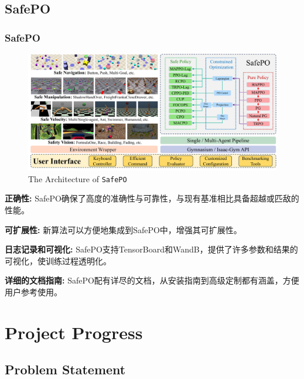 \documentclass[10pt,mathserif]{beamer}%
\begin{document}
\subsection{SafePO}
\begin{frame}[t,fragile]

    \frametitle{SafePO}
\begin{figure}[ht]
  \centering
  \includegraphics[width=0.8\linewidth]{Safety-Gymnasium/assets/main-paper/arch.pdf}
  \vspace*{-0.5\baselineskip}
  \caption{The Architecture of \texttt{SafePO}}
  \label{pic:architecture}
\end{figure}
\vspace{-0.5cm}
\begin{itemize}
{
\fontsize{8pt}{9.6pt}\selectfont
    \item \textbf{正确性:} SafePO确保了高度的准确性与可靠性，与现有基准相比具备超越或匹敌的性能。
    \item \textbf{可扩展性:} 新算法可以方便地集成到SafePO中，增强其可扩展性。
    \item \textbf{日志记录和可视化:} SafePO支持TensorBoard和WandB，提供了许多参数和结果的可视化，使训练过程透明化。
    \item \textbf{详细的文档指南:} SafePO配有详尽的文档，从安装指南到高级定制都有涵盖，方便用户参考使用。
}
\end{itemize}

\end{frame}

\section{Project Progress}

\subsection{Problem Statement}
\end{document}
